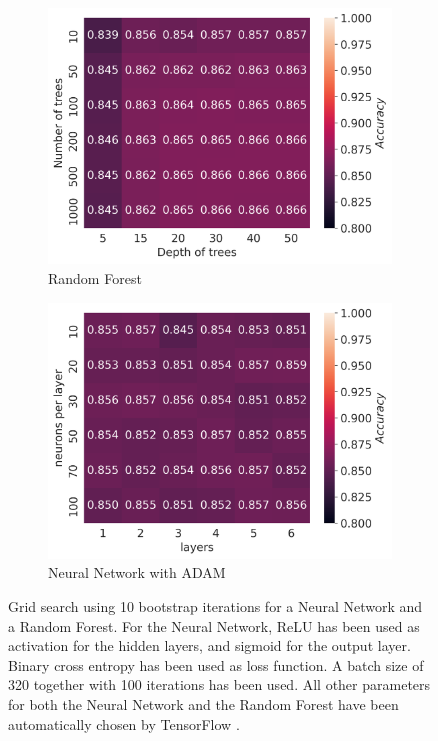 \documentclass[11pt]{article}
\begin{document}
\begin{figure}[H]
    \begin{subfigure}{.5\textwidth}
        \centering
        \includegraphics[width=\textwidth]{../figures/RF_grid_all.png}
        \caption{Random Forest}
        \label{fig:rf_full}
    \end{subfigure}
    \begin{subfigure}{.5\textwidth}
        \centering
        \includegraphics[width=\textwidth]{../figures/NN_grid_ADAM_all.png}
        \caption{Neural Network with ADAM}
        \label{fig:NN_full}
    \end{subfigure}
    \caption{Grid search using 10 bootstrap iterations for a Neural Network and a Random Forest. For the Neural Network, ReLU has been used as activation for the hidden layers, and sigmoid for the output layer. Binary cross entropy has been used as loss function. A batch size of 320 together with 100 iterations has been used. All other parameters for both the Neural Network and the Random Forest have been automatically chosen by TensorFlow \cite{tf}\cite{tfrf}.}
    \label{fig:grid_full}
\end{figure}
\end{document}
